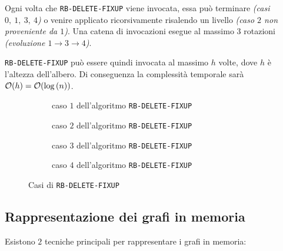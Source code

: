 \documentclass[italian, 10pt]{article}
\begin{document}
Ogni volta che \texttt{RB-DELETE-FIXUP} viene invocata, essa può terminare \textit{(casi \(0,\ 1,\ 3,\ 4\))} o venire applicato ricorsivamente risalendo un livello \textit{(caso \(2\) non proveniente da \(1\))}.
Una catena di invocazioni esegue al massimo \(3\) rotazioni \textit{(evoluzione \(1 \rightarrow 3 \rightarrow 4\))}.

\texttt{RB-DELETE-FIXUP} può essere quindi invocata al massimo \(h\) volte, dove \(h\) è l'altezza dell'albero.
Di conseguenza la complessità temporale sarà \(\mathcal{O}(h) = \mathcal{O}(\log{(n)})\).

\begin{figure}[htbp]
  \begin{subfigure}{\textwidth}
    \centering
    \bigskip
    \caption{caso \(1\) dell'algoritmo \texttt{RB-DELETE-FIXUP}}
    \label{fig:caso-1-algoritmo-rb-delete-fixup}
    \bigskip
  \end{subfigure}
  \begin{subfigure}{0.99\textwidth}
    \centering
    \bigskip
    \caption{caso \(2\) dell'algoritmo \texttt{RB-DELETE-FIXUP}}
    \label{fig:caso-2-algoritmo-rb-delete-fixup}
    \bigskip
  \end{subfigure}
  \begin{subfigure}{0.99\textwidth}
    \centering
    \bigskip
    \caption{caso \(3\) dell'algoritmo \texttt{RB-DELETE-FIXUP}}
    \label{fig:caso-3-algoritmo-rb-delete-fixup}
    \bigskip
  \end{subfigure}
  \begin{subfigure}{0.99\textwidth}
    \centering
    \bigskip
    \caption{caso \(4\) dell'algoritmo \texttt{RB-DELETE-FIXUP}}
    \label{fig:caso-4-algoritmo-rb-delete-fixup}
    \bigskip
  \end{subfigure}

  \caption{Casi di \texttt{RB-DELETE-FIXUP}}
  \label{fig:casi-algoritmo-rb-delete-fixup}
\end{figure}

\subsection{Rappresentazione dei grafi in memoria}

Esistono \(2\) tecniche principali per rappresentare i grafi in memoria:
\end{document}
